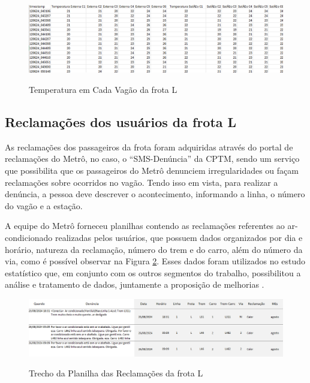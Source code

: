 \documentclass[acronym,symbols,table]{fei}
\begin{document}
    \begin{figure}[!htb]
    \centering
    \caption{Temperatura em Cada Vagão da frota L}
    \includegraphics[width=1\linewidth]{Imagens/Temperatura_Carros.png}
    \label{fig:Temperatura_Carros}
    \end{figure}

\subsection{Reclamações dos usuários da frota L}

    As reclamações dos passageiros da frota foram adquiridas através do portal de reclamações do Metrô, no caso, o “SMS-Denúncia” da CPTM, sendo um serviço que possibilita que os passageiros do Metrô denunciem irregularidades ou façam reclamações sobre ocorridos no vagão. Tendo isso em vista, para realizar a denúncia, a pessoa deve descrever o acontecimento, informando a linha, o número do vagão e a estação. 
    
    A equipe do Metrô forneceu planilhas contendo as reclamações referentes ao ar-condicionado realizadas pelos usuários, que possuem dados organizados por dia e horário, natureza da reclamação, número do trem e do carro, além do número da via, como é possível observar na Figura \ref{fig:SMS_Denuncia}. Esses dados foram utilizados no estudo estatístico que, em conjunto com os outros segmentos do trabalho, possibilitou a análise e tratamento de dados, juntamente a proposição  de melhorias \cite{metrosp2024}.
    
\begin{figure}[!htb]
    \centering
    \caption{Trecho da Planilha das Reclamações da frota L}
    \includegraphics[width=1.0\linewidth]{Imagens/SMS_Denuncia.png}
    \label{fig:SMS_Denuncia}
\end{figure}
\end{document}
